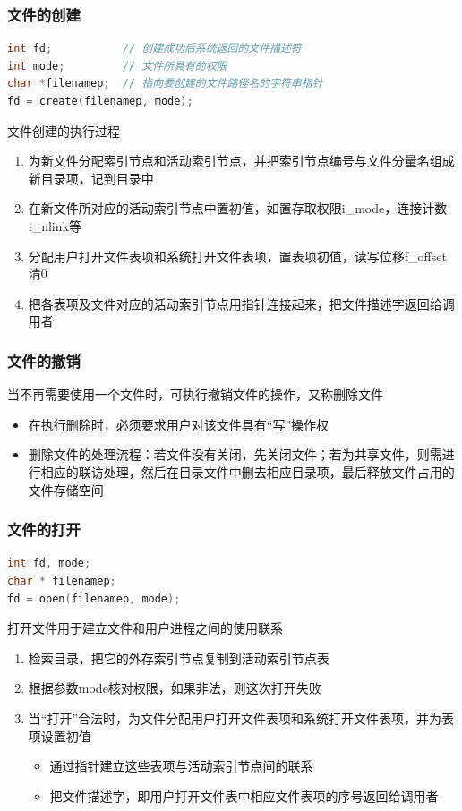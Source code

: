 \documentclass[cs4size,a4paper,10pt]{ctexart}
\begin{document}
	\subsubsection{文件的创建}
	\begin{lstlisting}[language=C,keywordstyle=\color{black}]
int fd;           // 创建成功后系统返回的文件描述符
int mode;         // 文件所具有的权限
char *filenamep;  // 指向要创建的文件路径名的字符串指针
fd = create(filenamep, mode);		
	\end{lstlisting}

	文件创建的执行过程
	\begin{enumerate}[label=\arabic*.]
		\item 为新文件分配索引节点和活动索引节点，并把索引节点编号与文件分量名组成新目录项，记到目录中
		\item 在新文件所对应的活动索引节点中置初值，如置存取权限i\_mode，连接计数i\_nlink等
		\item 分配用户打开文件表项和系统打开文件表项，置表项初值，读写位移f\_offset清0
		\item 把各表项及文件对应的活动索引节点用指针连接起来，把文件描述字返回给调用者
	\end{enumerate}

	\subsubsection{文件的撤销}
	当不再需要使用一个文件时，可执行撤销文件的操作，又称删除文件
	\begin{itemize}
		\item 在执行删除时，必须要求用户对该文件具有“写”操作权
		\item 删除文件的处理流程：若文件没有关闭，先关闭文件；若为共享文件，则需进行相应的联访处理，然后在目录文件中删去相应目录项，最后释放文件占用的文件存储空间
	\end{itemize}

	\subsubsection{文件的打开}
	\begin{lstlisting}[language=C,keywordstyle=\color{black}]
int fd, mode;
char * filenamep;
fd = open(filenamep, mode);		
	\end{lstlisting}

	打开文件用于建立文件和用户进程之间的使用联系
	\begin{enumerate}[label=\arabic*.]
		\item 检索目录，把它的外存索引节点复制到活动索引节点表
		\item 根据参数mode核对权限，如果非法，则这次打开失败
		\item 当“打开”合法时，为文件分配用户打开文件表项和系统打开文件表项，并为表项设置初值
		\begin{itemize}
			\item 通过指针建立这些表项与活动索引节点间的联系
			\item 把文件描述字，即用户打开文件表中相应文件表项的序号返回给调用者
		\end{itemize}
	\end{enumerate}
\end{document}
